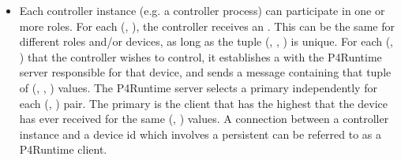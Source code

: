 \documentclass[11pt]{article}
\begin{document}
{\begin{itemize}
\item{}
Each controller instance (e.g. a controller process) can participate in one or
more roles. For each (, ), the controller receives an
. This  can be the same for different roles and/or
devices, as long as the tuple (, , ) is
unique. For each (, ) that the controller wishes to
control, it establishes a  with the P4Runtime server
responsible for that device, and sends a  message
containing that tuple of (, , ) values. The
P4Runtime server selects a primary independently for each (,
) pair. The primary is the client that has the highest 
that the device has ever received for the same (,
) values.  A connection between a controller instance and a device id
\textemdash{} which involves a persistent  \textemdash{} can be referred to as a
P4Runtime client.%


\end{itemize}}
\end{document}
